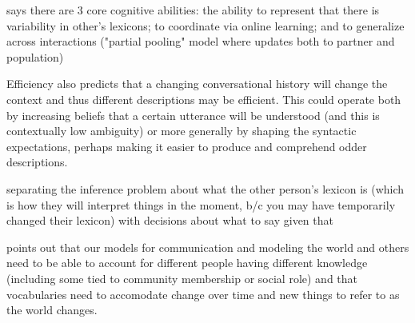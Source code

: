 \documentclass[]{article}
\begin{document}
	\cite{hawkins2021} says there are 3 core cognitive abilities: the ability to represent that there is variability in other's lexicons; to coordinate via online learning; and to generalize across interactions ("partial pooling" model where updates both to partner and population) 

Efficiency also predicts that a changing conversational history will change the context and thus different descriptions may be efficient. This could operate both by increasing beliefs that a certain utterance will be understood (and this is contextually low ambiguity) or more generally by shaping the syntactic expectations, perhaps making it easier to produce and comprehend odder descriptions. 

\cite{hawkins2021} separating the inference problem about what the other person's lexicon is (which is how they will interpret things in the moment, b/c you may have temporarily changed their lexicon) with decisions about what to say given that 

\cite{hawkins2021} points out that our models for communication and modeling the world and others need to be able to account for different people having different knowledge (including some tied to community membership or social role) and that vocabularies need to accomodate change over time and new things to refer to as the world changes. 
\end{document}
